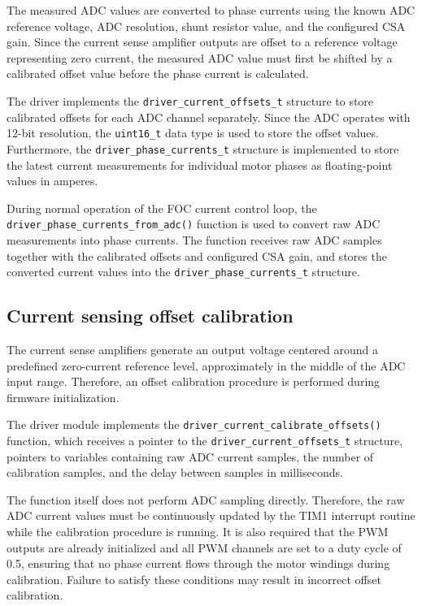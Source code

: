 The measured ADC values are converted to phase currents using the known ADC reference voltage, ADC resolution, shunt resistor value,
and the configured CSA gain. Since the current sense amplifier outputs are offset to a reference voltage representing zero current,
the measured ADC value must first be shifted by a calibrated offset value before the phase current is calculated.

The driver implements the \texttt{driver\_current\_offsets\_t} structure to store calibrated offsets for each ADC channel separately.
Since the ADC operates with 12-bit resolution, the \texttt{uint16\_t} data type is used to store the offset values.
Furthermore, the \texttt{driver\_phase\_currents\_t} structure is implemented to store the latest current measurements 
for individual motor phases as floating-point values in amperes.

During normal operation of the FOC current control loop, the\\ \texttt{driver\_phase\_currents\_from\_adc()} 
function is used to convert raw ADC measurements into phase currents.
The function receives raw ADC samples together with the calibrated offsets and configured CSA gain,
and stores the converted current values into the \texttt{driver\_phase\_currents\_t} structure.

\newpage
\subsection{Current sensing offset calibration}
The current sense amplifiers generate an output voltage centered around a predefined zero-current reference level,
approximately in the middle of the ADC input range.
Therefore, an offset calibration procedure is performed during firmware initialization.

The driver module implements the \texttt{driver\_current\_calibrate\_offsets()} function, which receives a pointer to the
\texttt{driver\_current\_offsets\_t} structure, pointers to variables containing raw ADC current samples,
the number of calibration samples, and the delay between samples in milliseconds.

The function itself does not perform ADC sampling directly.
Therefore, the raw ADC current values must be continuously updated by the TIM1 interrupt routine while the calibration procedure is running.
It is also required that the PWM outputs are already initialized and all PWM channels are set to a duty cycle of 0.5,
ensuring that no phase current flows through the motor windings during calibration.
Failure to satisfy these conditions may result in incorrect offset calibration.

